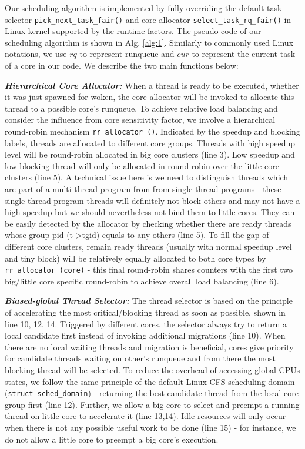 \documentclass{sig-alternate}
\begin{document}
Our scheduling algorithm is implemented by fully overriding the default task selector \texttt{pick\_next\_task\_fair()} and core allocator \texttt{select\_task\_rq\_fair()} in Linux kernel supported by the runtime factors. The pseudo-code of our scheduling algorithm is shown in Alg. \ref{alg:1}. 
Similarly to commonly used Linux notations, we use $rq$ to represent runqueue and $cur$ to represent the current task of a core in our code. We describe the two main functions below:

\textbf{\textit{Hierarchical Core Allocator:}}
When a thread is ready to be executed, whether it was just spawned for woken, the core allocator will be invoked to allocate this thread to a possible core's runqueue. To achieve relative load balancing and consider the influence from core sensitivity factor, we involve a hierarchical round-robin mechanism \texttt{rr\_allocator\_()}. Indicated by the speedup and blocking labels, threads are allocated to different core groups. Threads with high speedup level will be round-robin allocated in big core clusters (line 3). Low speedup and low blocking thread will only be allocated in round-robin over the little core clusters (line 5). A technical issue here is we need to distinguish threads which are part of a multi-thread program from from single-thread programs - these single-thread program threads will definitely not block others and may not have a high speedup but we should nevertheless not bind them to little cores. They can be easily detected by the allocator by checking whether there are ready threads whose group pid (t->tgid) equals to any others (line 5). To fill the gap of different core clusters, remain ready threads (usually with normal speedup level and tiny block) will be relatively equally allocated to both core types by \texttt{rr\_allocator\_(core)} - this final round-robin shares counters with the first two big/little core specific round-robin to achieve overall load balancing (line 6).  

\textbf{\textit{Biased-global Thread Selector:}}
The thread selector is based on the principle of accelerating the most critical/blocking thread as soon as possible, shown in line 10, 12, 14. Triggered by different cores, the selector always try to return  a local candidate first instead of invoking additional migrations (line 10). When there are no local waiting threads and migration is beneficial, cores give priority for candidate threads waiting on other's runqueue and from there the most blocking thread will be selected.
To reduce the overhead of accessing global CPUs states, we follow the same principle of the default Linux CFS scheduling domain (\texttt{struct sched\_domain}) - returning the best candidate thread from the local core group first (line 12).
Further, we allow a big core to select and preempt a running thread on little core to accelerate it (line 13,14). Idle resources will only occur when there is not any possible useful work to be done (line 15) - for instance, we do not allow a little core to preempt a big core's execution. 
\end{document}
